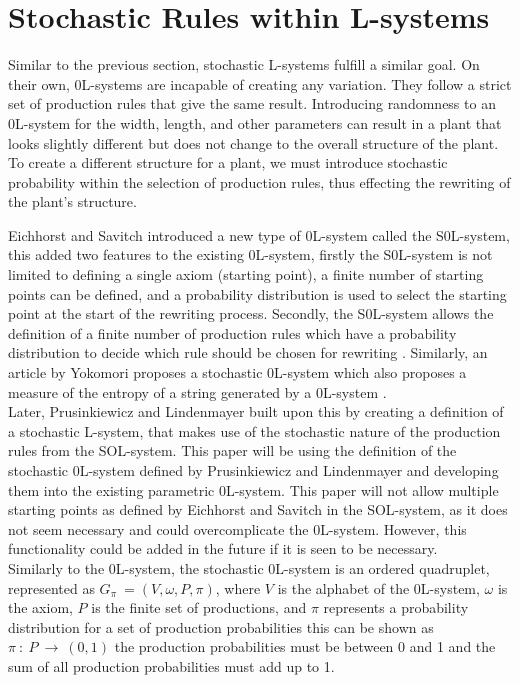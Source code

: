 \section{Stochastic Rules within L-systems} \label{Stochastic L-system Subsection}

Similar to the previous section, stochastic L-systems fulfill a similar goal. On their own, 0L-systems are incapable of creating any variation. They follow a strict set of production rules that give the same result. Introducing randomness to an 0L-system for the width, length, and other parameters can result in a plant that looks slightly different but does not change to the overall structure of the plant. To create a different structure for a plant, we must introduce stochastic probability within the selection of production rules, thus effecting the rewriting of the plant's structure.

Eichhorst and Savitch introduced a new type of 0L-system called the S0L-system, this added two features to the existing 0L-system, firstly the S0L-system is not limited to defining a single axiom (starting point), a finite number of starting points can be defined, and a probability distribution is used to select the starting point at the start of the rewriting process. Secondly, the S0L-system allows the definition of a finite number of production rules which have a probability distribution to decide which rule should be chosen for rewriting \cite{eichhorst1980growth}. Similarly, an article by Yokomori proposes a stochastic 0L-system which also proposes a measure of the entropy of a string generated by a 0L-system \cite{yokomori1980stochastic}.\\
Later, Prusinkiewicz and Lindenmayer built upon this by creating a definition of a stochastic L-system, that makes use of the stochastic nature of the production rules from the SOL-system. This paper will be using the definition of the stochastic 0L-system defined by Prusinkiewicz and Lindenmayer and developing them into the existing parametric 0L-system. This paper will not allow multiple starting points as defined by Eichhorst and Savitch in the SOL-system, as it does not seem necessary and could overcomplicate the 0L-system. However, this functionality could be added in the future if it is seen to be necessary. \\
Similarly to the 0L-system, the stochastic 0L-system is an ordered quadruplet, represented as $G_\pi~ = (V, \omega, P, \pi)$, where $V$ is the alphabet of the 0L-system, $\omega$ is the axiom, $P$ is the finite set of productions, and $\pi$ represents a probability distribution for a set of production probabilities this can be shown as $\pi~ :~ P~ \rightarrow~ (0, 1)$ the production probabilities must be between 0 and 1 and the sum of all production probabilities must add up to 1.

